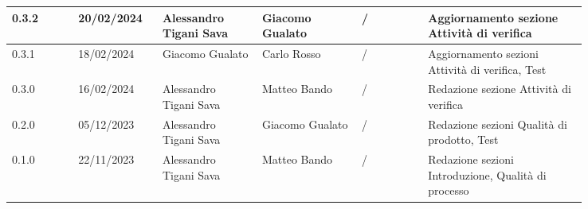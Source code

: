 {\begin{longtable}{p{0.10\linewidth}p{0.10\linewidth}p{0.15\linewidth}p{0.15\linewidth}p{0.10\linewidth}p{0.24\linewidth}}
	  \hline
	  0.3.2             & 20/02/2024    & Alessandro Tigani Sava & Giacomo Gualato       & /                    & Aggiornamento sezione Attività di verifica              \\
	  \hline
	  0.3.1             & 18/02/2024    & Giacomo Gualato        & Carlo Rosso           & /                    & Aggiornamento sezioni Attività di verifica, Test        \\
	  \hline
	  0.3.0             & 16/02/2024    & Alessandro Tigani Sava & Matteo Bando          & /                    & Redazione sezione Attività di verifica                  \\
	  \hline
	  0.2.0             & 05/12/2023    & Alessandro Tigani Sava & Giacomo Gualato       & /                    & Redazione sezioni Qualità di prodotto, Test             \\
	  \hline
	  0.1.0             & 22/11/2023    & Alessandro Tigani Sava & Matteo Bando          & /                    & Redazione sezioni Introduzione, Qualità di processo     \\
	  \bottomrule
  \end{longtable}
 }